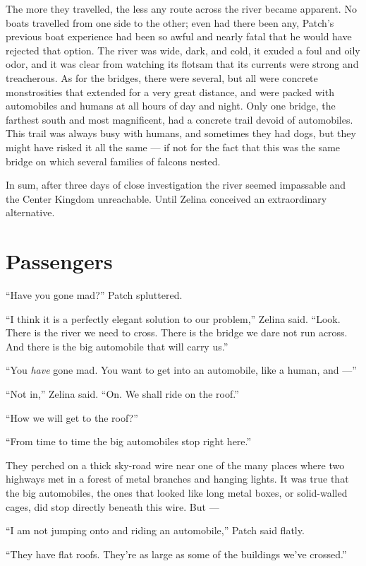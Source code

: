 \documentclass[ebook,oneside,openany,17pt]{memoir}
\newenvironment{tolerant}[1]{%
  \par\tolerance=#1\relax
}{%
  \par
}
\renewcommand{\thechapter}{\Roman{chapter}}
\newcounter{sections}
\newcommand{\sections}[1]{%
  \section*{#1}
  \addtocounter{sections}{1}%
  \pdfbookmark[1]{#1}{section.\thechapter.\thesections}}
\begin{document}
\begin{tolerant}{2000}
The more they travelled, the less any route across the river became
apparent. No boats travelled from one side to the other; even had
there been any, Patch’s previous boat experience had been so awful and
nearly fatal that he would have rejected that option. The river was
wide, dark, and cold, it exuded a foul and oily odor, and it was clear
from watching its flotsam that its currents were strong and
treacherous. As for the bridges, there were several, but all were
concrete monstrosities that extended for a very great distance, and
were packed with automobiles and humans at all hours of day and
night. Only one bridge, the farthest south and most magnificent, had a
concrete trail devoid of automobiles. This trail was always busy with
humans, and sometimes they had dogs, but they might have risked it all
the same — if not for the fact that this was the same bridge on which
several families of falcons nested.
\end{tolerant}

In sum, after three days of close investigation the river seemed
impassable and the Center Kingdom unreachable. Until Zelina conceived
an extraordinary alternative.


\sections{Passengers}

“Have you gone mad?” Patch spluttered.

“I think it is a perfectly elegant solution to our problem,” Zelina
said. “Look. There is the river we need to cross. There is the bridge
we dare not run across. And there is the big automobile that will
carry us.”

“You \emph{have} gone mad. You want to get into an automobile, like
a human, and —”

“Not in,” Zelina said. “On. We shall ride on the roof.”

“How we will get to the roof?”

“From time to time the big automobiles stop right here.”

They perched on a thick sky-road wire near one of the many places
where two highways met in a forest of metal branches and hanging
lights. It was true that the big automobiles, the ones that looked
like long metal boxes, or solid-walled cages, did stop directly
beneath this wire. But —

“I am not jumping onto and riding an automobile,” Patch said flatly.

“They have flat roofs. They’re as large as some of the buildings we’ve
crossed.”
\end{document}
